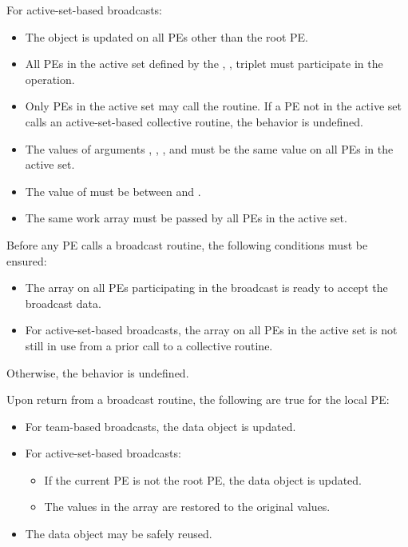 \begin{apidefinition}
{    For active-set-based broadcasts:
    \begin{itemize}
    \item The \dest{} object is updated on all \acp{PE} other than the
      root \ac{PE}.
    \item All \acp{PE} in the active set defined by the
      , ,  triplet
      must participate in the operation.
    \item Only \acp{PE} in the active set may call the routine.  If a
      \ac{PE} not in the active set calls an active-set-based
      collective routine, the behavior is undefined.
    \item The values of arguments , ,
      , and  must be the same value
      on all \acp{PE} in the active set.
    \item The value of  must be between  and
      .
    \item The same  work array must be passed by all \acp{PE}
      in the active set.
    \end{itemize}

    Before any \ac{PE} calls a broadcast routine, the following
    conditions must be ensured:
    \begin{itemize}
    \item The \dest{} array on all \acp{PE} participating in the broadcast
      is ready to accept the broadcast data.
    \item For active-set-based broadcasts, the
       array on all \acp{PE} in the
      active set is not still in use from a prior call to a collective
      \openshmem routine.
    \end{itemize}
    Otherwise, the behavior is undefined.

    Upon return from a broadcast routine, the following are true for the local
    \ac{PE}:
    \begin{itemize}
    \item For team-based broadcasts, the \dest{} data object is
      updated.
    \item For active-set-based broadcasts:
      \begin{itemize}
      \item If the current \ac{PE} is not the root \ac{PE}, the
        \dest{} data object is updated.
      \item The values in the  array are restored to the
        original values.
      \end{itemize}
    \item The \source{} data object may be safely reused.
    \end{itemize}
}



\end{apidefinition}
